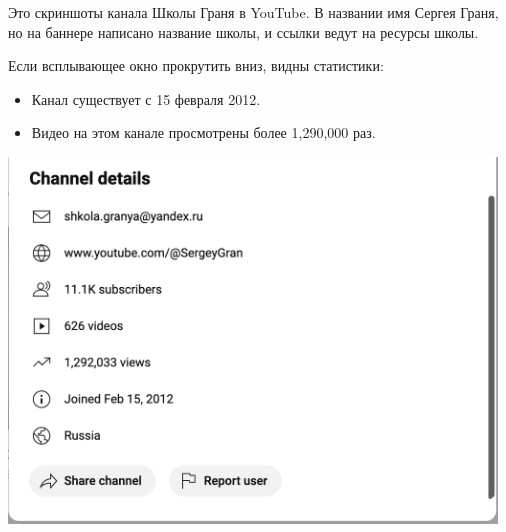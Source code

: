
Это скриншоты канала Школы Граня в YouTube.
В названии имя Сергея Граня, но на баннере написано название школы,
и ссылки ведут на ресурсы школы.

Если всплывающее окно прокрутить вниз,
видны статистики:

\begin{itemize}
    \item Канал существует с 15 февраля 2012.
    \item Видео на этом канале просмотрены более 1,290,000 раз.
\end{itemize}



\begin{center}
    \includegraphics[width=35em]{gran-youtube-stat}
\end{center}

\pagebreak
